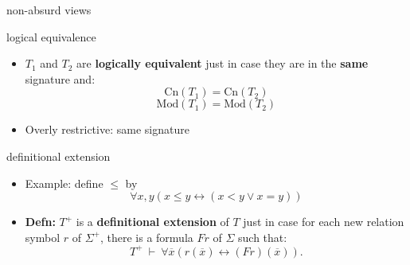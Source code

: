 \documentclass[17pt]{beamer}
\begin{document}
\begin{frame}{non-absurd views}



\begin{center}
\end{center}



\end{frame}




\begin{frame}{\small logical equivalence}

\begin{itemize}
\item $T_1$ and $T_2$ are \textbf{logically equivalent} just in case
they are in the \textbf{same} signature and:
\[ \mathrm{Cn}(T_1)=\mathrm{Cn}(T_2) \]
\[ \mathrm{Mod}(T_1)=\mathrm{Mod}(T_2) \]
\item Overly restrictive: same signature
\end{itemize}


\end{frame}



\begin{frame}{\small definitional extension}

\begin{itemize}
\item Example: define $\leq$ by 
\[ \forall x,y(x\leq y\leftrightarrow (x<y\vee x=y)) \]
\item \textbf{Defn:} $T^+$ is a \textbf{definitional extension} of $T$
  just in case for each new relation symbol $r$ of $\Sigma ^+$, there
  is a formula $Fr$ of $\Sigma$ such that:
\[ T^+ \: \vdash \: \forall \overline{x}(r(\overline{x})\leftrightarrow (Fr)(\overline{x})) .\]
\end{itemize}


\end{frame}
\end{document}
